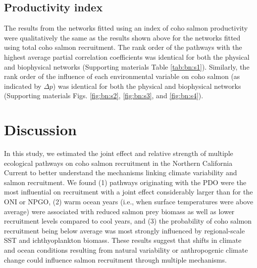 \subsection{Productivity index}

The results from the networks fitted using an index of coho salmon productivity
were qualitatively the same as the results shown above for the networks fitted
using total coho salmon recruitment. The rank order of the pathways with the
highest average partial correlation coefficients was identical for both the
physical and biophysical networks (Supporting materials Table \ref{tab:bn:s1}).
Similarly, the rank order of the influence of each environmental variable on
coho salmon (as indicated by \(\Delta p\)) was identical for both the physical
and biophysical networks (Supporting materials Figs. \ref{fig:bn:s2},
\ref{fig:bn:s3}, and \ref{fig:bn:s4}).



\section{Discussion}

In this study, we estimated the joint effect and relative strength of multiple
ecological pathways on coho salmon recruitment in the Northern California
Current to better understand the mechanisms linking climate variability and
salmon recruitment. We found (1) pathways originating with the PDO were the most
influential on recruitment with a joint effect considerably larger than for the
ONI or NPGO, (2) warm ocean years (i.e., when surface temperatures were above
average) were associated with reduced salmon prey biomass as well as lower
recruitment levels compared to cool years, and (3) the probability of coho
salmon recruitment being below average was most strongly influenced by
regional-scale SST and ichthyoplankton biomass. These results suggest that
shifts in climate and ocean conditions resulting from natural variability or
anthropogenic climate change could influence salmon recruitment through multiple
mechanisms.

